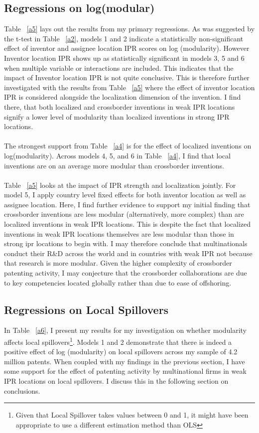 \documentclass[12pt]{article}
\begin{document}
\subsection{Regressions on log(modular)}
Table ~\ref{a5} lays out the results from my primary regressions. As was suggested by the t-test in Table ~\ref{a2}, models 1 and 2 indicate a statistically non-significant effect of inventor and assignee location IPR scores on log (modularity). However Inventor location IPR shows up as statistically significant in models 3, 5 and 6 when multiple variable or interactions are included. This indicates that the impact of Inventor location IPR is not quite conclusive. This is therefore further investigated with the results from Table ~\ref{a5} where the effect of inventor location IPR is considered alongside the localization dimension of the invention. I find there, that both localized and crossborder inventions in weak IPR locations signify a lower level of modularity than localized inventions in strong IPR locations.
\\\\
The strongest support from Table ~\ref{a4} is for the effect of localized inventions on log(modularity). Across models 4, 5, and 6 in Table ~\ref{a4}, I find that local inventions are on an average more modular than crossborder inventions.
\\\\
Table ~\ref{a5} looks at the impact of IPR strength and localization jointly. For model 5, I apply country level fixed effects for both inventor location as well as assignee location. Here, I find further evidence to support my initial finding that crossborder inventions are less modular (alternatively, more complex) than are localized inventions in weak IPR locations. This is despite the fact that localized inventions in weak IPR locations themselves are less modular than those in strong ipr locations to begin with. I may therefore conclude that multinationals conduct their R\&D across the world and in countries with weak IPR not because that research is more modular. Given the higher complexity of crossborder patenting activity, I may conjecture that the crossborder collaborations are due to key competencies located globally rather than due to ease of offshoring.

\subsection{Regressions on Local Spillovers}
In Table ~\ref{a6}, I present my results for my investigation on whether modularity affects local spillovers\footnote{Given that Local Spillover takes values between 0 and 1, it might have been appropriate to use a different estimation method than OLS}. Models 1 and 2 demonstrate that there is indeed a positive effect of log (modularity) on local spillovers across my sample of 4.2 million patents. When coupled with my findings in the previous section, I have some support for the effect of patenting activity by multinational firms in weak IPR locations on local spillovers. I discuss this in the following section on conclusions.
\end{document}

